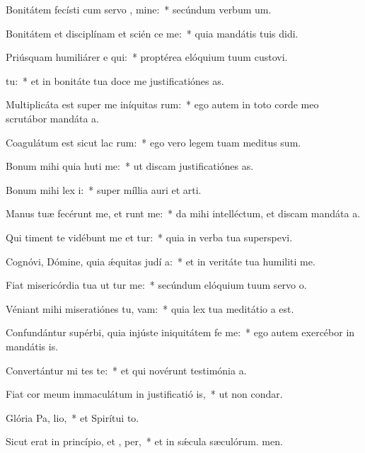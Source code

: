 \item Bonitátem fecísti cum servo , mine:~* secúndum verbum um.
\item Bonitátem et disciplínam et scién ce me:~* quia mandátis tuis didi.
\item Priúsquam humiliárer e qui:~* proptérea elóquium tuum custovi.
\item {}  tu:~* et in bonitáte tua doce me justificatiónes as.
\item Multiplicáta est super me iníquitas rum:~* ego autem in toto corde meo scrutábor mandáta a.
\item Coagulátum est sicut lac  rum:~* ego vero legem tuam meditus sum.
\item Bonum mihi quia huti me:~* ut discam justificatiónes as.
\item Bonum mihi lex  i:~* super míllia auri et arti.
\item Manus tuæ fecérunt me, et runt me:~* da mihi intelléctum, et discam mandáta a.
\item Qui timent te vidébunt me et tur:~* quia in verba tua superspevi.
\item Cognóvi, Dómine, quia ǽquitas judí a:~* et in veritáte tua humiliti me.
\item Fiat misericórdia tua ut tur me:~* secúndum elóquium tuum servo o.
\item Véniant mihi miseratiónes tu,  vam:~* quia lex tua meditátio a est.
\item Confundántur supérbi, quia injúste iniquitátem fe  me:~* ego autem exercébor in mandátis is.
\item Convertántur mi tes te:~* et qui novérunt testimónia a.
\item Fiat cor meum immaculátum in justificatió is,~* ut non condar.
\item Glória Pa,  lio,~* et Spirítui to.
\item Sicut erat in princípio, et ,  per,~* et in sǽcula sæculórum. men.
